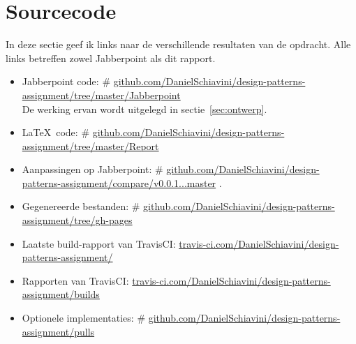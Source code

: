 \documentclass[a4paper]{article}
\makeatletter
\newcommand*{\repo}{\begingroup\@makeother\#\@repo}
\newcommand*{\@repo}[2]{%
  \href{https://github.com/DanielSchiavini/design-patterns-assignment/#1}{#2}%
  \endgroup}
\newcommand{\repolink}[1]{\repo{#1}{github.com\-/Daniel\-Schiavini\-/de\-sign-\-pat\-terns-\-as\-sign\-ment\-/#1}}
\newcommand{\cilink}[1]{\href{https://travis-ci.com/DanielSchiavini/design-patterns-assignment/#1}{travis-ci.com/DanielSchiavini/design-patterns-assignment/#1}}
\makeatother
\begin{document}
    
\section{Sourcecode}
In deze sectie geef ik links naar de verschillende resultaten van de opdracht.
Alle links betreffen zowel Jabberpoint als dit rapport.
\begin{itemize}
    \item Jabberpoint code:
        \repolink{tree/master/Jabberpoint}\\
        De werking ervan wordt uitgelegd in sectie~\ref{sec:ontwerp}.
    \item \LaTeX ~code:
        \repo{tree/master/Report}{github.com/DanielSchiavini/design-patterns-assignment/tree\-/master\-/Report}
    \item Aanpassingen op Jabberpoint:
        \repolink{compare/v0.0.1...master}.
    \item Gegenereerde bestanden:
        \repolink{tree/gh-pages}
    \item Laatste build-rapport van TravisCI:
        \cilink{}
    \item Rapporten van TravisCI:
        \cilink{builds}
    \item Optionele implementaties:
        \repolink{pulls}
\end{itemize}
\end{document}
